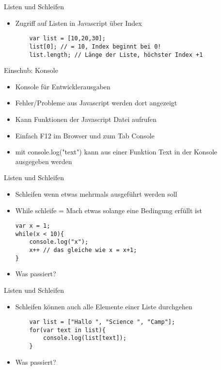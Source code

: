 \documentclass[18pt]{beamer}
\begin{document}
\begin{frame}[fragile]{Listen und Schleifen}
\begin{itemize}
	\item Zugriff auf Listen in Javascript über Index
	\begin{lstlisting}
	var list = [10,20,30];
	list[0]; // = 10, Index beginnt bei 0!
	list.length; // Länge der Liste, höchster Index +1 
	\end{lstlisting}
\end{itemize}
\end{frame}

\begin{frame}[fragile]{Einschub: Konsole}
\begin{itemize}
	\item Konsole für Entwicklerausgaben
	\item Fehler/Probleme aus Javascript werden dort angezeigt
	\item Kann Funktionen der Javascript Datei aufrufen
	\item Einfach F12 im Browser und zum Tab \glqq Console\grqq
	\item mit console.log("text") kann aus einer Funktion Text in der Konsole ausgegeben werden
\end{itemize}
\end{frame}


\begin{frame}[fragile]{Listen und Schleifen}
\begin{itemize}
\item Schleifen wenn etwas mehrmals ausgeführt werden soll
\item While schleife = \glqq Mach etwas solange eine Bedingung erfüllt ist\grqq
\begin{lstlisting}
var x = 1;
while(x < 10){
	console.log("x");
	x++ // das gleiche wie x = x+1;
}
\end{lstlisting}
\item Was passiert? 
\end{itemize}
\end{frame}

\begin{frame}[fragile]{Listen und Schleifen}
\begin{itemize}
	\item Schleifen können auch alle Elemente einer Liste durchgehen
	\begin{lstlisting}
	var list = ["Hallo ", "Science ", "Camp"];
	for(var text in list){
		console.log(list[text]);
	}
	\end{lstlisting}
	\item Was passiert? 
\end{itemize}
\end{frame}
\end{document}
